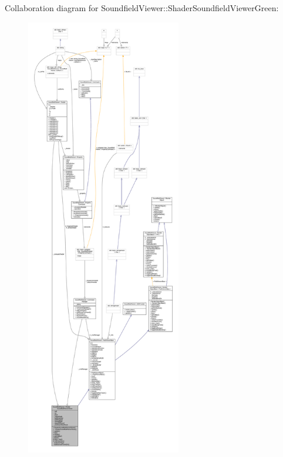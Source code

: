 Collaboration diagram for Soundfield\-Viewer\-:\-:Shader\-Soundfield\-Viewer\-Green\-:\nopagebreak
\begin{figure}[H]
\begin{center}
\leavevmode
\includegraphics[height=550pt]{d0/d15/classSoundfieldViewer_1_1ShaderSoundfieldViewerGreen__coll__graph}
\end{center}
\end{figure}
